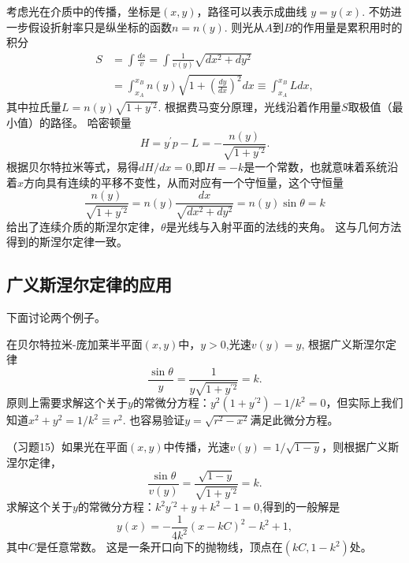 \documentclass{article}
\begin{document}
考虑光在介质中的传播，坐标是$(x, y)$，路径可以表示成曲线 $y=y(x)$.
不妨进一步假设折射率只是纵坐标的函数$n=n(y)$.
则光从$A$到$B$的作用量是累积用时的积分
\begin{equation}
\begin{aligned}
S
&=\int\frac{ds}{v}
=\int\frac{1}{v(y)}\sqrt{dx^{2}+dy^{2}} \\
&=\int_{x_{A}}^{x_{B}}n(y)\sqrt{1+\left(\frac{dy}{dx}\right)^{2}}dx
\equiv\int_{x_{A}}^{x_{B}}Ldx,
\end{aligned}
\end{equation}
其中拉氏量$L=n(y)\sqrt{1+y^{\prime{2}}}$.
根据费马变分原理，光线沿着作用量$S$取极值（最小值）的路径。
哈密顿量
\begin{equation}
    H
    =y^{\prime}p-L
    =-\frac{n(y)}{\sqrt{1+y^{\prime{2}}}}.
\end{equation}
根据贝尔特拉米等式，易得$dH/dx=0$,即$H=-k$是一个常数，也就意味着系统沿着$x$方向具有连续的平移不变性，从而对应有一个守恒量，这个守恒量
\begin{equation}
    \frac{n(y)}{\sqrt{1+y^{\prime{2}}}}
    =n(y)\frac{dx}{\sqrt{dx^{2}+dy^{2}}}
    =n(y)\sin\theta=k
\end{equation}
给出了连续介质的斯涅尔定律，$\theta$是光线与入射平面的法线的夹角。
这与几何方法得到的斯涅尔定律一致。

\subsection{广义斯涅尔定律的应用}

下面讨论两个例子。

在贝尔特拉米-庞加莱半平面$(x, y)$中，$y>0$,光速$v(y)=y$,
根据广义斯涅尔定律
\begin{equation*}
    \frac{\sin\theta}{y}
    =\frac{1}{y\sqrt{1+y^{\prime{2}}}}=k.
\end{equation*}
原则上需要求解这个关于$y$的常微分方程：$y^{2}(1+y^{\prime{2}})-1/k^{2}=0$，但实际上我们知道$x^{2}+y^{2}=1/k^{2}\equiv{r^{2}}$.
也容易验证$y=\sqrt{r^{2}-x^{2}}$满足此微分方程。

（习题15）如果光在平面$(x, y)$中传播，光速$v(y)=1/\sqrt{1-y}$，则根据广义斯涅尔定律，
\begin{equation*}
    \frac{\sin\theta}{v(y)}
    =\frac{\sqrt{1-y}}{\sqrt{1+y^{\prime{2}}}}=k.
\end{equation*}
求解这个关于$y$的常微分方程：$k^{2}y^{\prime{2}}+y+k^{2}-1=0$,得到的一般解是
\begin{equation*}
    y(x)
    =-\frac{1}{4k^{2}}\left(x-kC\right)^{2}-k^{2}+1,
\end{equation*}
其中$C$是任意常数。
这是一条开口向下的抛物线，顶点在$\left(kC, 1-k^{2}\right)$处。
\end{document}
